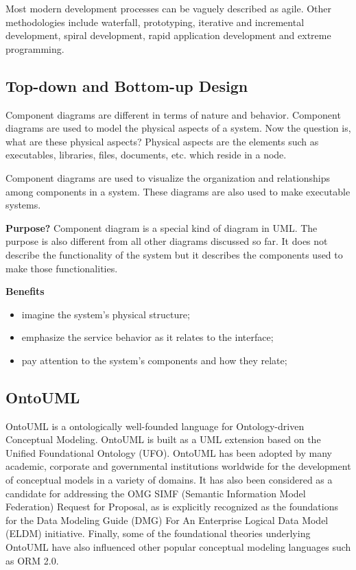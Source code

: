 \documentclass{article}
\begin{document}
			Most modern development processes can be vaguely described as agile. Other methodologies include waterfall, prototyping, iterative and incremental development, spiral development, rapid application development and extreme programming.

		\subsection{Top-down and Bottom-up Design}
			Component diagrams are different in terms of nature and behavior. Component diagrams are used to model the physical aspects of a system. Now the question is, what are these physical aspects? Physical aspects are the elements such as executables, libraries, files, documents, etc. which reside in a node.

			Component diagrams are used to visualize the organization and relationships among components in a system. These diagrams are also used to make executable systems.

			\textbf{Purpose?} Component diagram is a special kind of diagram in UML. The purpose is also different from all other diagrams discussed so far. It does not describe the functionality of the system but it describes the components used to make those functionalities.

			\textbf{Benefits}
			\begin{itemize}
				\item imagine the system’s physical structure;
				
				\item emphasize the service behavior as it relates to the interface;
				
				\item pay attention to the system’s components and how they relate;
			\end{itemize}

		\subsection{OntoUML}
			OntoUML is a ontologically well-founded language for Ontology-driven Conceptual Modeling. OntoUML is built as a UML extension based on the Unified Foundational Ontology (UFO). OntoUML has been adopted by many academic, corporate and governmental institutions worldwide for the development of conceptual models in a variety of domains. It has also been considered as a candidate for addressing the OMG SIMF (Semantic Information Model Federation) Request for Proposal, as is explicitly recognized as the foundations for the Data Modeling Guide (DMG) For An Enterprise Logical Data Model (ELDM) initiative. Finally, some of the foundational theories underlying OntoUML have also influenced other popular conceptual modeling languages such as ORM 2.0.
\end{document}
